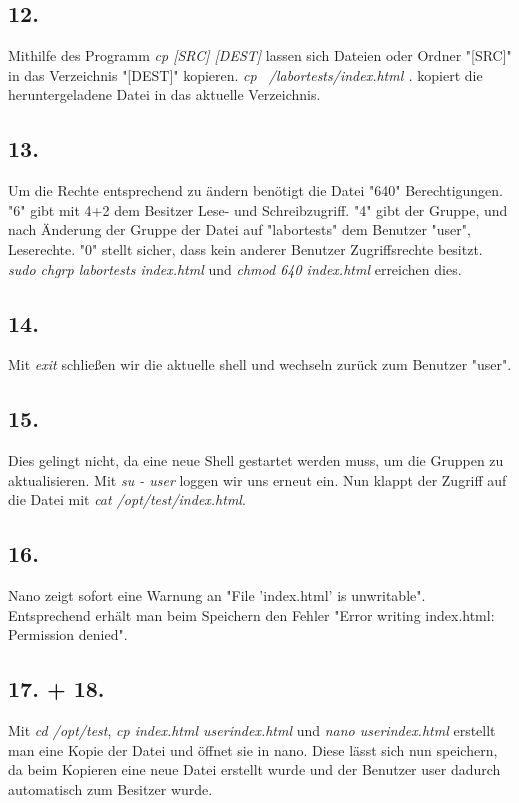 \documentclass[
    fontsize=12pt,
    headings=small,
    parskip=half,           %
    bibliography=totoc,
    numbers=noenddot,       %
    open=any,               %
    ]{scrreprt}
\begin{document}
\subsection*{12.}
Mithilfe des Programm \emph{cp [SRC] [DEST]} lassen sich Dateien oder Ordner "[SRC]" in das Verzeichnis "[DEST]" kopieren. \emph{cp ~/labortests/index.html .} kopiert die heruntergeladene Datei in das aktuelle Verzeichnis.

\subsection*{13.}
Um die Rechte entsprechend zu ändern benötigt die Datei "640" Berechtigungen. "6" gibt mit 4+2 dem Besitzer Lese- und Schreibzugriff. "4" gibt der Gruppe, und nach Änderung der Gruppe der Datei auf "labortests" dem Benutzer "user", Leserechte. "0" stellt sicher, dass kein anderer Benutzer Zugriffsrechte besitzt. \emph{sudo chgrp labortests index.html} und \emph{chmod 640 index.html} erreichen dies.

\subsection*{14.}
Mit \emph{exit} schließen wir die aktuelle shell und wechseln zurück zum Benutzer "user".

\subsection*{15.}
Dies gelingt nicht, da eine neue Shell gestartet werden muss, um die Gruppen zu aktualisieren. Mit \emph{su - user} loggen wir uns erneut ein. Nun klappt der Zugriff auf die Datei mit \emph{cat /opt/test/index.html}.

\subsection*{16.}
Nano zeigt sofort eine Warnung an "File 'index.html' is unwritable". Entsprechend erhält man beim Speichern den Fehler "Error writing index.html: Permission denied".

\subsection*{17. + 18.}
Mit \emph{cd /opt/test}, \emph{cp index.html userindex.html} und \emph{nano userindex.html} erstellt man eine Kopie der Datei und öffnet sie in nano. Diese lässt sich nun speichern, da beim Kopieren eine neue Datei erstellt wurde und der Benutzer user dadurch automatisch zum Besitzer wurde.
\end{document}
